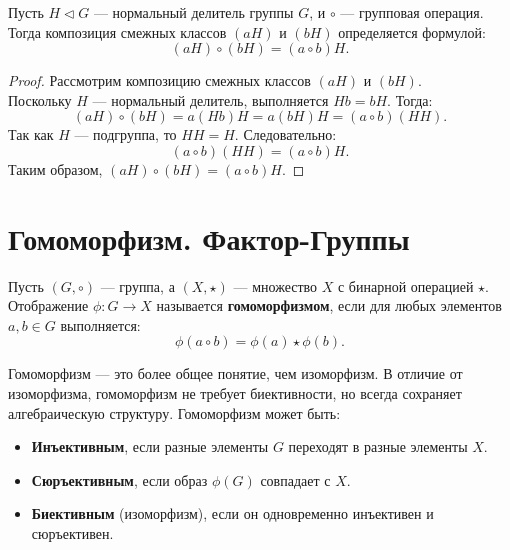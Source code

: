 \begin{shth}
    \begin{theorem}
        Пусть \( H \triangleleft G \) — нормальный делитель группы \( G \), и \( \circ \) — групповая операция. Тогда композиция смежных классов \( (aH) \) и \( (bH) \) определяется формулой:
        \[
        (aH) \circ (bH) = (a \circ b)H.
        \]
    \end{theorem}
\end{shth}

\begin{proof}
    Рассмотрим композицию смежных классов \( (aH) \) и \( (bH) \). \\Поскольку \( H \) — нормальный делитель, выполняется \( Hb = bH \). Тогда:
    \[
    (aH) \circ (bH) = a(Hb)H = a(bH)H = (a \circ b)(HH).
    \]
    Так как \( H \) — подгруппа, то \( HH = H \). Следовательно:
    \[
    (a \circ b)(HH) = (a \circ b)H.
    \]
    Таким образом, \( (aH) \circ (bH) = (a \circ b)H \).
\end{proof}

\clearpage
\section{Гомоморфизм. Фактор-Группы}

\begin{shdef}
    \begin{definition}[Гомоморфизм]
        Пусть \( (G, \circ) \) — группа, а \( (X, \star) \) — множество \( X \) с бинарной операцией \( \star \). Отображение \( \phi: G \to X \) называется \textbf{гомоморфизмом}, если для любых элементов \( a, b \in G \) выполняется:
        \[
        \phi(a \circ b) = \phi(a) \star \phi(b).
        \]
        

        \begin{remark}
            Гомоморфизм — это более общее понятие, чем изоморфизм. В отличие от \\изоморфизма, гомоморфизм не требует биективности, но всегда сохраняет \\алгебраическую структуру. Гомоморфизм может быть:
            \begin{itemize}
                \item \textbf{Инъективным}, если разные элементы \( G \) переходят в разные элементы \( X \).
                \item \textbf{Сюръективным}, если образ \( \phi(G) \) совпадает с \( X \).
                \item \textbf{Биективным} (изоморфизм), если он одновременно инъективен и сюръективен.
            \end{itemize}
        \end{remark}
    \end{definition}
\end{shdef}

